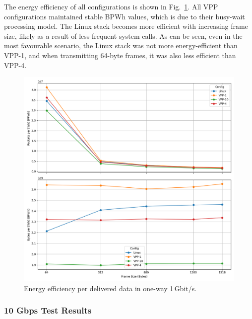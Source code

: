 The energy efficiency of all configurations is shown in Fig.~\ref{fig:1g}. All VPP configurations maintained stable BPWh values, which is due to their busy-wait processing model.
The Linux stack becomes more efficient with increasing frame size, likely as a result of less frequent system calls.
As can be seen, even in the most favourable scenario, the Linux stack was not more energy-efficient than VPP-1, and when transmitting 64-byte frames, it was also less efficient than VPP-4.

\begin{figure}[!htbp]
    \centering
    \includegraphics[width=\linewidth]{images/consumption-1g.png}
    \caption{Energy efficiency per delivered data in one-way 1\,Gbit/s.}
    \label{fig:1g}
\end{figure}


\subsubsection{10 Gbps Test Results}

